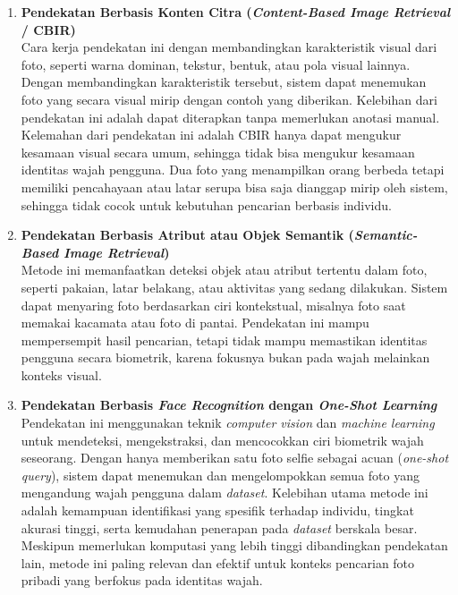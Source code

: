 \begin{enumerate}
    
    \item \textbf{Pendekatan Berbasis Konten Citra (\textit{Content-Based Image Retrieval} / CBIR)} \\
    Cara kerja pendekatan ini dengan membandingkan karakteristik visual dari foto, seperti warna dominan, tekstur, bentuk, atau pola visual lainnya. Dengan membandingkan karakteristik tersebut, sistem dapat menemukan foto yang secara visual mirip dengan contoh yang diberikan. Kelebihan dari pendekatan ini adalah dapat diterapkan tanpa memerlukan anotasi manual. Kelemahan dari pendekatan ini adalah CBIR hanya dapat mengukur kesamaan visual secara umum, sehingga tidak bisa mengukur kesamaan identitas wajah pengguna. Dua foto yang menampilkan orang berbeda tetapi memiliki pencahayaan atau latar serupa bisa saja dianggap mirip oleh sistem, sehingga tidak cocok untuk kebutuhan pencarian berbasis individu.
    
    \item \textbf{Pendekatan Berbasis Atribut atau Objek Semantik (\textit{Semantic-Based Image Retrieval})} \\
    Metode ini memanfaatkan deteksi objek atau atribut tertentu dalam foto, seperti pakaian, latar belakang, atau aktivitas yang sedang dilakukan. Sistem dapat menyaring foto berdasarkan ciri kontekstual, misalnya foto saat memakai kacamata atau foto di pantai. Pendekatan ini mampu mempersempit hasil pencarian, tetapi tidak mampu memastikan identitas pengguna secara biometrik, karena fokusnya bukan pada wajah melainkan konteks visual.

    \item \textbf{Pendekatan Berbasis \textit{Face Recognition} dengan \textit{One-Shot Learning}} \\ 
    Pendekatan ini menggunakan teknik \textit{computer vision} dan \textit{machine learning} untuk mendeteksi, mengekstraksi, dan mencocokkan ciri biometrik wajah seseorang. Dengan hanya memberikan satu foto selfie sebagai acuan (\textit{one-shot query}), sistem dapat menemukan dan mengelompokkan semua foto yang mengandung wajah pengguna dalam \textit{dataset}. Kelebihan utama metode ini adalah kemampuan identifikasi yang spesifik terhadap individu, tingkat akurasi tinggi, serta kemudahan penerapan pada \textit{dataset} berskala besar. Meskipun memerlukan komputasi yang lebih tinggi dibandingkan pendekatan lain, metode ini paling relevan dan efektif untuk konteks pencarian foto pribadi yang berfokus pada identitas wajah.

\end{enumerate}



